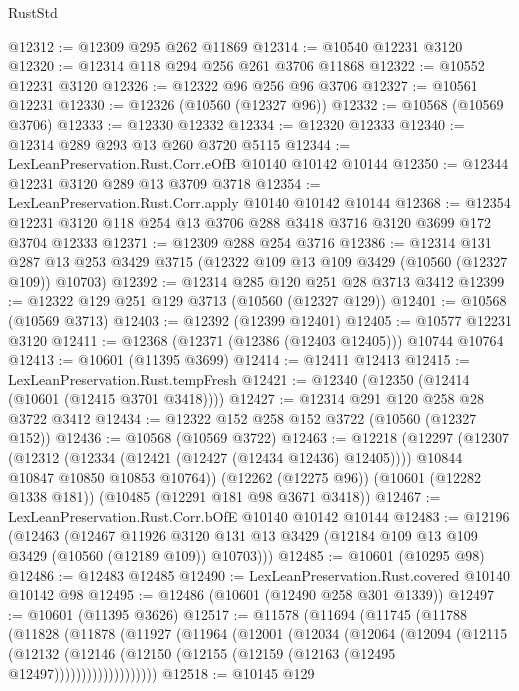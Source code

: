 \begin{lexlean}{RustStd}
\begin{coremodule}
@12312 := @12309 @295 @262 @11869
@12314 := @10540 @12231 @3120
@12320 := @12314 @118 @294 @256 @261 @3706 @11868
@12322 := @10552 @12231 @3120
@12326 := @12322 @96 @256 @96 @3706
@12327 := @10561 @12231
@12330 := @12326 (@10560 (@12327 @96))
@12332 := @10568 (@10569 @3706)
@12333 := @12330 @12332
@12334 := @12320 @12333
@12340 := @12314 @289 @293 @13 @260 @3720 @5115
@12344 := LexLeanPreservation.Rust.Corr.eOfB @10140 @10142 @10144
@12350 := @12344 @12231 @3120 @289 @13 @3709 @3718
@12354 := LexLeanPreservation.Rust.Corr.apply @10140 @10142 @10144
@12368 := @12354 @12231 @3120 @118 @254 @13 @3706 @288 @3418 @3716 @3120 @3699 @172 @3704 @12333
@12371 := @12309 @288 @254 @3716
@12386 := @12314
    @131
    @287
    @13
    @253
    @3429
    @3715
    (@12322 @109 @13 @109 @3429 (@10560 (@12327 @109)) @10703)
@12392 := @12314 @285 @120 @251 @28 @3713 @3412
@12399 := @12322 @129 @251 @129 @3713 (@10560 (@12327 @129))
@12401 := @10568 (@10569 @3713)
@12403 := @12392 (@12399 @12401)
@12405 := @10577 @12231 @3120
@12411 := @12368 (@12371 (@12386 (@12403 @12405))) @10744 @10764
@12413 := @10601 (@11395 @3699)
@12414 := @12411 @12413
@12415 := LexLeanPreservation.Rust.tempFresh
@12421 := @12340 (@12350 (@12414 (@10601 (@12415 @3701 @3418))))
@12427 := @12314 @291 @120 @258 @28 @3722 @3412
@12434 := @12322 @152 @258 @152 @3722 (@10560 (@12327 @152))
@12436 := @10568 (@10569 @3722)
@12463 := @12218
    (@12297
      (@12307
        (@12312 (@12334 (@12421 (@12427 (@12434 @12436) @12405))))
        @10844
        @10847
        @10850
        @10853
        @10764))
    (@12262 (@12275 @96))
    (@10601 (@12282 @1338 @181))
    (@10485 (@12291 @181 @98 @3671 @3418))
@12467 := LexLeanPreservation.Rust.Corr.bOfE @10140 @10142 @10144
@12483 := @12196
    (@12463
      (@12467
        @11926
        @3120
        @131
        @13
        @3429
        (@12184 @109 @13 @109 @3429 (@10560 (@12189 @109)) @10703)))
@12485 := @10601 (@10295 @98)
@12486 := @12483 @12485
@12490 := LexLeanPreservation.Rust.covered @10140 @10142 @98
@12495 := @12486 (@10601 (@12490 @258 @301 @1339))
@12497 := @10601 (@11395 @3626)
@12517 := @11578
    (@11694
      (@11745
        (@11788
          (@11828
            (@11878
              (@11927
                (@11964
                  (@12001
                    (@12034
                      (@12064
                        (@12094
                          (@12115
                            (@12132
                              (@12146
                                (@12150 (@12155 (@12159 (@12163 (@12495 @12497)))))))))))))))))))
@12518 := @10145 @129

\end{coremodule}
\end{lexlean}
